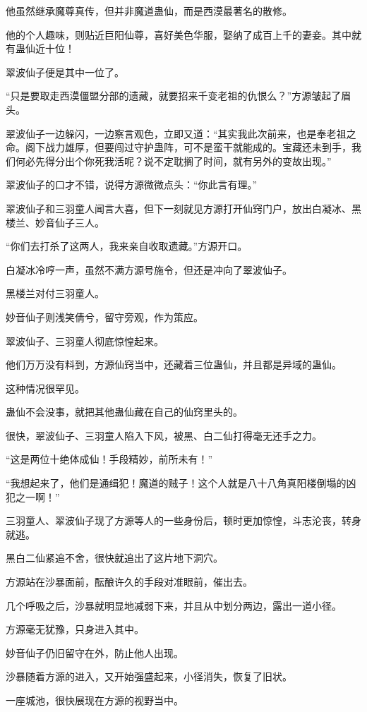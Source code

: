 \begin{this_body}
他虽然继承魔尊真传，但并非魔道蛊仙，而是西漠最著名的散修。

他的个人趣味，则贴近巨阳仙尊，喜好美色华服，娶纳了成百上千的妻妾。其中就有蛊仙近十位！

翠波仙子便是其中一位了。

“只是要取走西漠僵盟分部的遗藏，就要招来千变老祖的仇恨么？”方源皱起了眉头。

翠波仙子一边躲闪，一边察言观色，立即又道：“其实我此次前来，也是奉老祖之命。阁下战力雄厚，但要闯过守护蛊阵，可不是蛮干就能成的。宝藏还未到手，我们何必先得分出个你死我活呢？说不定耽搁了时间，就有另外的变故出现。”

翠波仙子的口才不错，说得方源微微点头：“你此言有理。”

翠波仙子和三羽童人闻言大喜，但下一刻就见方源打开仙窍门户，放出白凝冰、黑楼兰、妙音仙子三人。

“你们去打杀了这两人，我来亲自收取遗藏。”方源开口。

白凝冰冷哼一声，虽然不满方源号施令，但还是冲向了翠波仙子。

黑楼兰对付三羽童人。

妙音仙子则浅笑倩兮，留守旁观，作为策应。

翠波仙子、三羽童人彻底惊惶起来。

他们万万没有料到，方源仙窍当中，还藏着三位蛊仙，并且都是异域的蛊仙。

这种情况很罕见。

蛊仙不会没事，就把其他蛊仙藏在自己的仙窍里头的。

很快，翠波仙子、三羽童人陷入下风，被黑、白二仙打得毫无还手之力。

“这是两位十绝体成仙！手段精妙，前所未有！”

“我想起来了，他们是通缉犯！魔道的贼子！这个人就是八十八角真阳楼倒塌的凶犯之一啊！”

三羽童人、翠波仙子现了方源等人的一些身份后，顿时更加惊惶，斗志沦丧，转身就逃。

黑白二仙紧追不舍，很快就追出了这片地下洞穴。

方源站在沙暴面前，酝酿许久的手段对准眼前，催出去。

几个呼吸之后，沙暴就明显地减弱下来，并且从中划分两边，露出一道小径。

方源毫无犹豫，只身进入其中。

妙音仙子仍旧留守在外，防止他人出现。

沙暴随着方源的进入，又开始强盛起来，小径消失，恢复了旧状。

一座城池，很快展现在方源的视野当中。


\end{this_body}
